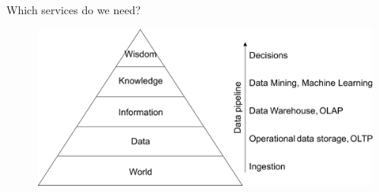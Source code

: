 \begin{frame}{Which services do we need?}
\begin{figure}
\centering
\includegraphics[height=.7\textheight]{imgs/knowledgepyramid.pdf}
\end{figure}
\end{frame}

